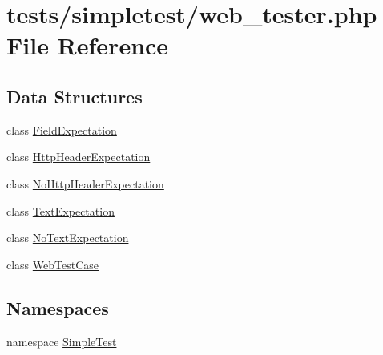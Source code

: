 \hypertarget{web__tester_8php}{\section{tests/simpletest/web\-\_\-tester.php File Reference}
\label{web__tester_8php}
}
\subsection*{Data Structures}
\begin{DoxyCompactItemize}
\item 
class \hyperlink{class_field_expectation}{Field\-Expectation}
\item 
class \hyperlink{class_http_header_expectation}{Http\-Header\-Expectation}
\item 
class \hyperlink{class_no_http_header_expectation}{No\-Http\-Header\-Expectation}
\item 
class \hyperlink{class_text_expectation}{Text\-Expectation}
\item 
class \hyperlink{class_no_text_expectation}{No\-Text\-Expectation}
\item 
class \hyperlink{class_web_test_case}{Web\-Test\-Case}
\end{DoxyCompactItemize}
\subsection*{Namespaces}
\begin{DoxyCompactItemize}
\item 
namespace \hyperlink{namespace_simple_test}{Simple\-Test}
\end{DoxyCompactItemize}
